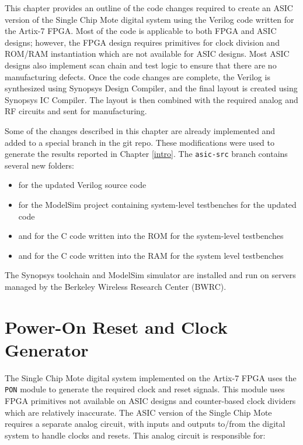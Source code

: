 This chapter provides an outline of the code changes required to create an ASIC version of the Single Chip Mote digital system using the Verilog code written for the Artix-7 FPGA. Most of the code is applicable to both FPGA and ASIC designs; however, the FPGA design requires primitives for clock division and ROM/RAM instantiation which are not available for ASIC designs. Most ASIC designs also implement scan chain and test logic to ensure that there are no manufacturing defects. Once the code changes are complete, the Verilog is synthesized using Synopsys Design Compiler, and the final layout is created using Synopsys IC Compiler. The layout is then combined with the required analog and RF circuits and sent for manufacturing.

Some of the changes described in this chapter are already implemented and added to a special branch in the git repo. These modifications were used to generate the results reported in Chapter \ref{intro}. The \texttt{asic-src} branch contains several new folders: 

\begin{itemize}
	\item {} for the updated Verilog source code
	\item {} for the ModelSim project containing system-level testbenches for the updated code
	\item {} and  for the C code written into the ROM for the system-level testbenches
	\item {} and  for the C code written into the RAM for the system level testbenches 
\end{itemize}

The Synopsys toolchain and ModelSim simulator are installed and run on servers managed by the Berkeley Wireless Research Center (BWRC).

\section{Power-On Reset and Clock Generator}
The Single Chip Mote digital system implemented on the Artix-7 FPGA uses the \texttt{PON} module to generate the required clock and reset signals. This module uses FPGA primitives not available on ASIC designs and counter-based clock dividers which are relatively inaccurate. The ASIC version of the Single Chip Mote requires a separate analog circuit, with inputs and outputs to/from the digital system to handle clocks and resets. This analog circuit is responsible for:

